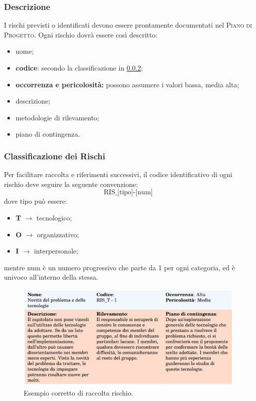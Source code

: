     \subsubsection{Descrizione}
        I rischi previsti o identificati devono essere prontamente documentati nel \textsc{Piano di Progetto}. Ogni rischio dovrà essere così descritto:
        \begin{itemize}
            \item nome;
            \item \textbf{codice}: secondo la classificazione in \ref{classifrischi};
            \item \textbf{occorrenza e pericolosità: }possono assumere i valori bassa, media alta;
            \item descrizione;
            \item metodologie di rilevamento;
            \item piano di contingenza.
        \end{itemize}
    \subsubsection{Classificazione dei Rischi}
    \label{classifrischi}
        Per facilitare raccolta e riferimenti successivi, il codice identificativo di ogni rischio deve seguire la seguente convenzione:
        $$ \text{RIS\_[tipo]-[num]} $$
        dove tipo può essere:
        \begin{itemize}
            \item \textbf{T} $\rightarrow$ tecnologico;
            \item \textbf{O} $\rightarrow$ organizzativo;
            \item \textbf{I} $\rightarrow$ interpersonale;
        \end{itemize}
    mentre num è un numero progressivo che parte da 1 per ogni categoria, ed è univoco all'interno della stessa.
    \begin{figure}[H]
        \centering
        \includegraphics[scale=0.6]{res/images/esempio_rischio.png}
        \caption{Esempio corretto di raccolta rischio.}
    \end{figure}

